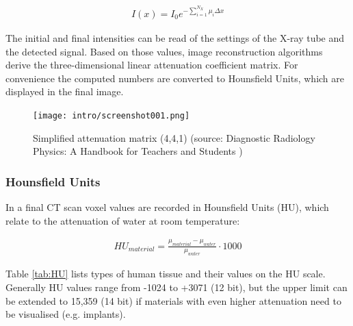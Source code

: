 \begin{align}
\label{eq:mu_sum}
I(x) = I_0 e^{- \sum\limits_{i=1}^{N_X} \mu_i \Delta x}
\end{align}

The initial and final intensities can be read of the settings of the X-ray tube and the detected signal.
Based on those values, image reconstruction algorithms derive the three-dimensional linear attenuation coefficient matrix.
For convenience the computed numbers are converted to Hounsfield Units, which are displayed in the final image. \cite{Podgorsak, Maidment2014}

\begin{figure}[!htb]
	\centering
	\texttt{[image: intro/screenshot001.png]}
	\caption{Simplified attenuation matrix (4,4,1) (source: Diagnostic Radiology Physics: A Handbook for Teachers and Students \cite{Maidment2014})}
	\label{fig:voxel_matrix}
\end{figure}

\subsubsection{Hounsfield Units}

In a final CT scan voxel values are recorded in Hounsfield Units (HU), which relate to the attenuation of water at room temperature:

\begin{align}
HU_{material} = \frac{\mu_{material} - \mu_{water}}{\mu_{water}} \cdot 1000
\end{align}

Table \ref{tab:HU} lists types of human tissue and their values on the HU scale.
Generally HU values range from -1024 to +3071 (12 bit), but the upper limit can be extended to 15,359 (14 bit) if materials with even higher attenuation need to be visualised (e.g. implants).

